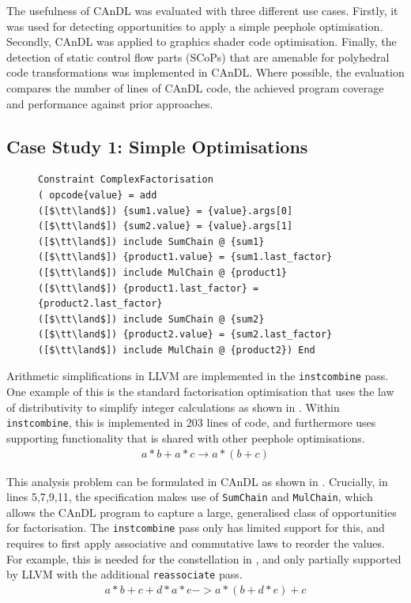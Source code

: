     The usefulness of CAnDL was evaluated with three different use cases.
    Firstly, it was used for detecting opportunities to apply a simple peephole
    optimisation.
    Secondly, CAnDL was applied to graphics shader code optimisation.
    Finally, the detection of static control flow parts (SCoPs) that are
    amenable for polyhedral code transformations was implemented in CAnDL.
    Where possible, the evaluation compares the number of lines of CAnDL code,
    the achieved program coverage and performance against prior approaches.

\subsection{Case Study 1: Simple Optimisations}

\begin{figure}[t]
\begin{lstlisting}[language=CAnDL,label={fig:facopport},caption=
   {Factorisation opportunities in CAnDL: This captures some opportunities that
    LLVM {\tt instcombine} misses. {\tt SumChain} and {\tt MulChain} are
    themselves specified in CAnDL (16 LoC).}]
Constraint ComplexFactorisation
( opcode{value} = add
([$\tt\land$]) {sum1.value} = {value}.args[0]
([$\tt\land$]) {sum2.value} = {value}.args[1]
([$\tt\land$]) include SumChain @ {sum1}
([$\tt\land$]) {product1.value} = {sum1.last_factor}
([$\tt\land$]) include MulChain @ {product1}
([$\tt\land$]) {product1.last_factor} = {product2.last_factor}
([$\tt\land$]) include SumChain @ {sum2}
([$\tt\land$]) {product2.value} = {sum2.last_factor}
([$\tt\land$]) include MulChain @ {product2}) End
\end{lstlisting}
\end{figure}

    Arithmetic simplifications in LLVM are implemented in the
    \texttt{instcombine} pass.
    One example of this is the standard factorisation optimisation that uses the
    law of distributivity to simplify integer calculations as shown in
    .
    Within {\tt instcombine}, this is implemented in 203 lines of code, and
    furthermore uses supporting functionality that is shared with other peephole
    optimisations.
    \begin{align}
        a*b+a*c\rightarrow a*(b+c)
        \label{fig:factorization1}
    \end{align}

    This analysis problem can be formulated in CAnDL as shown in
    .
    Crucially, in lines 5,7,9,11, the specification makes use of
    \texttt{SumChain} and \texttt{MulChain}, which allows the CAnDL program
    to capture a large, generalised class of opportunities for factorisation.
    The \texttt{instcombine} pass only has limited support for this, and
    requires to first apply associative and commutative laws to reorder the
    values.
    For example, this is needed for the constellation in
    , and only partially supported by LLVM with the
    additional \texttt{reassociate} pass.
    \begin{align}
        a*b+c+d*a*e->a*(b+d*e)+c
        \label{fig:factorization2}
    \end{align}

